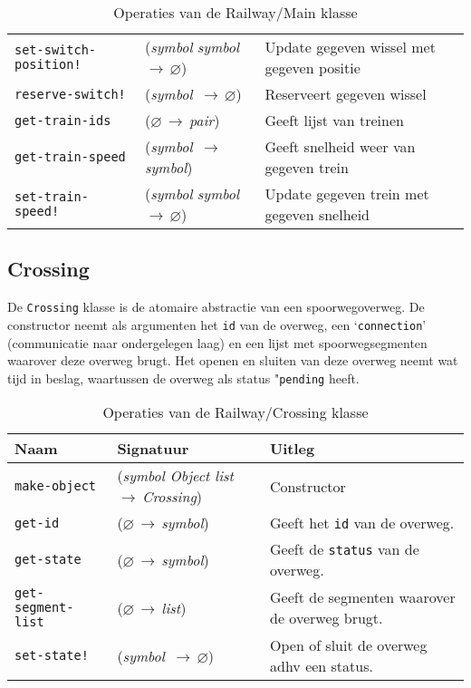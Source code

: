 \documentclass[a4paper, 11pt]{article}
\newcommand{\naar}{\,$\rightarrow$\,}
\renewcommand{\empty}{$\varnothing$}
\newcommand{\<}{\scriptsize\textless\normalsize}
\renewcommand{\>}{\scriptsize\textgreater\normalsize}
\begin{document}
\begin{table}[H]
\begin{center}
\begin{tabular}{|l l l|}
			\texttt{set-switch-position!} & (\textit{symbol} \textit{symbol} \naar \empty) & Update gegeven wissel met gegeven positie\\
			\texttt{reserve-switch!} & (\textit{symbol} \naar \empty) & Reserveert gegeven wissel\\
			\texttt{get-train-ids} & (\empty \naar \textit{pair}) & Geeft lijst van treinen\\
			\texttt{get-train-speed} & (\textit{symbol} \naar \textit{symbol}) & Geeft snelheid weer van gegeven trein\\
			\texttt{set-train-speed!} & (\textit{symbol} \textit{symbol} \naar \empty) & Update gegeven trein met gegeven snelheid\\
			\hline
		\end{tabular}
		\caption{Operaties van de Railway/Main klasse}
	\end{center}
\end{table}

\subsection{Crossing} %
De \texttt{Crossing} klasse is de atomaire abstractie van een spoorwegoverweg. De constructor neemt als argumenten het \texttt{id} van de overweg, een \lq\texttt{connection}' (communicatie naar ondergelegen laag) en een lijst met spoorwegsegmenten waarover deze overweg brugt. Het openen en sluiten van deze overweg neemt wat tijd in beslag, waartussen de overweg als status "\texttt{pending} heeft.
\begin{table}[H]
	\begin{center}
		\begin{tabular}{|l l l|}
			\hline
			\textbf{Naam} & \textbf{Signatuur} & \textbf{Uitleg}\\
			\hline
			\texttt{make-object} & (\textit{symbol Object list} \naar \textit{Crossing}) & Constructor\\
			\hline
			\texttt{get-id} & (\empty \naar \textit{symbol}) & Geeft het \texttt{id} van de overweg.\\
			\texttt{get-state} & (\empty \naar \textit{symbol}) & Geeft de \texttt{status} van de overweg.\\
			\texttt{get-segment-list} & (\empty \naar \textit{list}) & Geeft de segmenten waarover de overweg brugt.\\
			\texttt{set-state!} & (\textit{symbol} \naar \empty) & Open of sluit de overweg adhv een status.\\
			\hline
		\end{tabular}
		\caption{Operaties van de Railway/Crossing klasse}
	\end{center}
\end{table}
\end{document}
